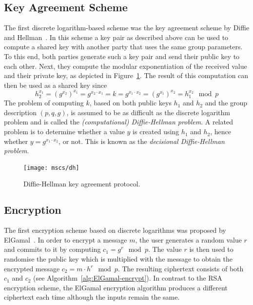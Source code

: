 \subsection{Key Agreement Scheme}

The first discrete logarithm-based scheme was the key agreement scheme by Diffie
and Hellman~\cite{DH1976}. In this scheme a key pair as described above can be
used to compute a shared key with another party that uses the same group
parameters. To this end, both parties generate such a key pair and send their
public key to each other. Next, they compute the modular exponentiation of the
received value and their private key, as depicted in Figure~\ref{msc:DH}. The
result of this computation can then be used as a shared key
since
\begin{equation*}
  h_2^{x_1} = (g^{x_2})^{x_1} = g^{x_2 \cdot x_1}
  = k = g^{x_1 \cdot x_2} = (g^{x_1})^{x_2} = h_1^{x_2} \mod p
\end{equation*}
The problem of computing $k$, based on both public keys $h_1$ and $h_2$ and the
group description $(p, q, g)$, is assumed to be as difficult as the discrete
logarithm problem and is called the \emph{(computational) Diffie-Hellman problem}. A related
problem is to determine whether a value $y$ is created using $h_1$ and $h_2$,
hence whether $y = g^{x_1 \cdot x_2}$, or not. This is known as the
\emph{decisional Diffie-Hellman problem}.

\begin{figure}[ht]
  \centering
  \texttt{[image: mscs/dh]}
  \caption{Diffie-Hellman key agreement protocol.}
  \label{msc:DH}
\end{figure}

\subsection{Encryption}

The first encryption scheme based on discrete logarithms was proposed by
ElGamal~\cite{ElGamal1985}. In order to encrypt a message $m$, the user
generates a random value $r$ and commits to it by computing $c_1 = g^r \mod p$.
The value $r$ is then used to randomise the public key which is multiplied with
the message to obtain the encrypted message $c_2 = m \cdot h^r \mod p$. The
resulting ciphertext consists of both $c_1$ and $c_2$ (see Algorithm~\ref{alg:ElGamal-encrypt}).
In contrast to the RSA encryption scheme, the ElGamal encryption algorithm
produces a different ciphertext each time although the inputs remain the same.

